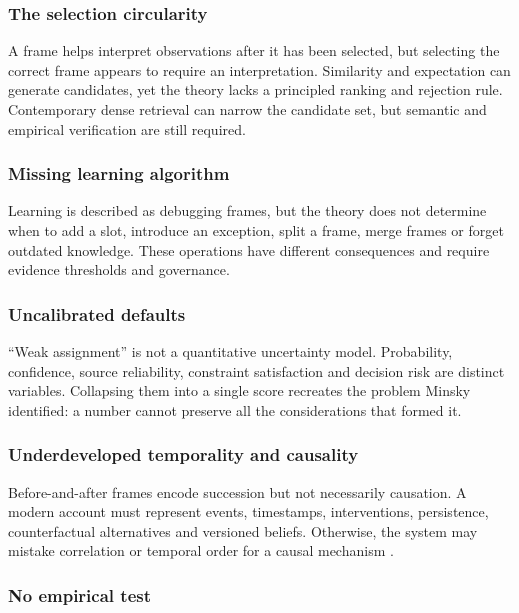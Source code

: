 \documentclass[11pt,a4paper]{article}
\begin{document}
\subsubsection{The selection circularity}

A frame helps interpret observations after it has been selected, but selecting
the correct frame appears to require an interpretation. Similarity and
expectation can generate candidates, yet the theory lacks a principled ranking
and rejection rule. Contemporary dense retrieval can narrow the candidate set,
but semantic and empirical verification are still required.

\subsubsection{Missing learning algorithm}

Learning is described as debugging frames, but the theory does not determine
when to add a slot, introduce an exception, split a frame, merge frames or
forget outdated knowledge. These operations have different consequences and
require evidence thresholds and governance.

\subsubsection{Uncalibrated defaults}

``Weak assignment'' is not a quantitative uncertainty model. Probability,
confidence, source reliability, constraint satisfaction and decision risk are
distinct variables. Collapsing them into a single score recreates the problem
Minsky identified: a number cannot preserve all the considerations that formed
it.

\subsubsection{Underdeveloped temporality and causality}

Before-and-after frames encode succession but not necessarily causation. A
modern account must represent events, timestamps, interventions, persistence,
counterfactual alternatives and versioned beliefs. Otherwise, the system may
mistake correlation or temporal order for a causal mechanism
\citep{pearl2009causality}.

\subsubsection{No empirical test}
\end{document}
